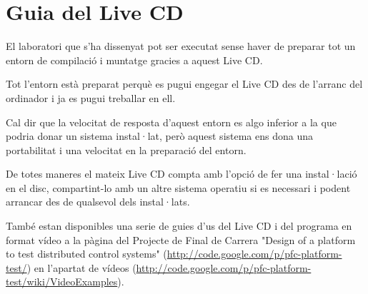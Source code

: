 
\chapter{Guia del Live CD}\label{cap:cd_gui}


\ifpdf
    \graphicspath{{6_live_cd_guide/figures/PNG/}{6_live_cd_guide/figures/PDF/}{6_live_cd_guide/figures/}}
\else
    \graphicspath{{6_live_cd_guide/figures/EPS/}{6_live_cd_guide/figures/}}
\fi



El laboratori que s'ha dissenyat pot ser executat sense haver de preparar tot un entorn de compilació i muntatge gracies a aquest Live CD.
	
Tot l'entorn està preparat perquè es pugui engegar el Live CD des de l'arranc del ordinador i ja es pugui treballar en ell.
	
Cal dir que la velocitat de resposta d'aquest entorn es algo inferior a la que podria donar un sistema instal·lat, però aquest sistema ens dona una portabilitat i una velocitat en la preparació del entorn.
	
De totes maneres el mateix Live CD compta amb l'opció de fer una instal·lació en el disc, compartint-lo amb un altre sistema operatiu si es necessari i podent arrancar des de qualsevol dels instal·lats.

També estan disponibles una serie de guies d'us del Live CD i del programa \DCSMonitor en format vídeo a la pàgina del Projecte de Final de Carrera "Design of a platform to test distributed control systems" (\href{http://code.google.com/p/pfc-platform-test/}{http://code.google.com/p/pfc-platform-test/}) en l'apartat de vídeos (\href{http://code.google.com/p/pfc-platform-test/wiki/VideoExamples}{http://code.google.com/p/pfc-platform-test/wiki/VideoExamples}).

